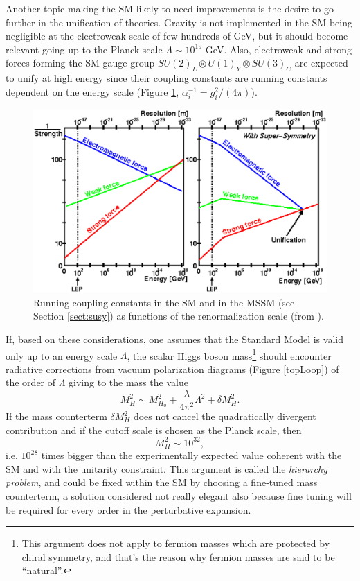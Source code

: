 Another topic making the SM likely to need improvements is the desire to go further in the unification of theories. Gravity is not implemented in the SM being negligible at the electroweak scale of few hundreds of GeV, but it should become relevant going up to the Planck scale $\Lambda \sim 10^{19}$ GeV. Also, electroweak and strong forces forming the SM gauge group $SU(2)_{L}\otimes U(1)_{Y}\otimes SU(3)_{C}$ are expected to unify at high energy since their coupling constants are running constants dependent on the energy scale (Figure \ref{running}, $\alpha^{-1}_{i} = g^{2}_{i}/(4\pi)$). 
\begin{figure}[htb]\begin{center}
\includegraphics[width=.8\textwidth]{theory/figures/running_coupling}
\caption{Running coupling constants in the SM and in the MSSM (see Section \ref{sect:susy}) as functions of the renormalization scale (from \cite{pdg2008}).}
\label{running}\end{center}\end{figure}
If, based on these considerations,  one assumes that the Standard Model is valid only up to  an energy scale $\Lambda$, the scalar Higgs boson mass\footnote{This argument does not apply to fermion masses which are protected by chiral symmetry, and that's the reason why fermion masses are said to be ``natural''.} should encounter radiative corrections from vacuum polarization diagrams (Figure \ref{topLoop}) of the order of $\Lambda$ giving to the mass the value \cite{dawson-1997} \begin{equation}\label{eq:higgsMass}
M_{H}^{2} \sim M_{H_{0}}^{2} + \dfrac{\lambda}{4\pi^{2}} \Lambda^{2} + \delta M_{H}^{2}. \end{equation}
If the mass counterterm $\delta M_{H}^{2}$ does not cancel the quadratically divergent contribution and if the cutoff scale is chosen as the Planck scale, then
\begin{equation}
M_{H}^{2} \sim 10^{32},\end{equation} i.e. $10^{28}$ times bigger than the experimentally expected value coherent with the SM and with the unitarity constraint. This argument is called the \textit{hierarchy problem}, and could be fixed within the SM by choosing a fine-tuned mass counterterm, a solution considered not really elegant also because fine tuning will be required for every order in the perturbative expansion.
